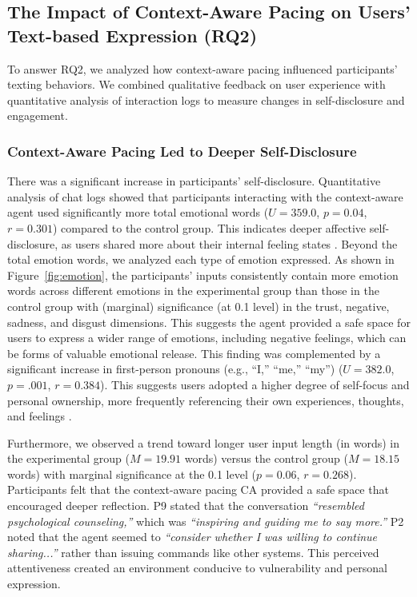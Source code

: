 \subsection{The Impact of Context-Aware Pacing on Users' Text-based Expression (\textbf{RQ2})}

To answer RQ2, we analyzed how context-aware pacing influenced participants' texting behaviors. We combined qualitative feedback on user experience with quantitative analysis of interaction logs to measure changes in self-disclosure and engagement.

\subsubsection{Context-Aware Pacing Led to Deeper Self-Disclosure}
\label{subsubsec:disclosure}
There was a significant increase in participants' self-disclosure. Quantitative analysis of chat logs showed that participants interacting with the context-aware agent used significantly more total emotional words ($U=359.0$, $p=0.04$, $r=0.301$) compared to the control group. This indicates deeper affective self-disclosure, as users shared more about their internal feeling states \cite{Studer2025The,Liu2022The}.
Beyond the total emotion words, we analyzed each type of emotion expressed.
As shown in Figure~\ref{fig:emotion}, the participants' inputs consistently contain more emotion words across different emotions in the experimental group than those in the control group with (marginal) significance (at 0.1 level) in the trust, negative, sadness, and disgust dimensions. This suggests the agent provided a safe space for users to express a wider range of emotions, including negative feelings, which can be forms of valuable emotional release.
This finding was complemented by a significant increase in first-person pronouns (e.g., ``I,'' ``me,'' ``my'') ($U=382.0$, $p=.001$, $r=0.384$). This suggests users adopted a higher degree of self-focus and personal ownership, more frequently referencing their own experiences, thoughts, and feelings \cite{Brockmeyer2015Me, reuel-etal-2022-measuring}.

Furthermore, we observed a trend toward longer user input length (in words) in the experimental group ($M=19.91$ words) versus the control group ($M=18.15$ words) with marginal significance at the 0.1 level ($p=0.06$, $r=0.268$). Participants felt that the context-aware pacing CA provided a safe space that encouraged deeper reflection. P9 stated that the conversation \textit{``resembled psychological counseling,''} which was \textit{``inspiring and guiding me to say more.''} P2 noted that the agent seemed to \textit{``consider whether I was willing to continue sharing...''} rather than issuing commands like other systems. This perceived attentiveness created an environment conducive to vulnerability and personal expression.

